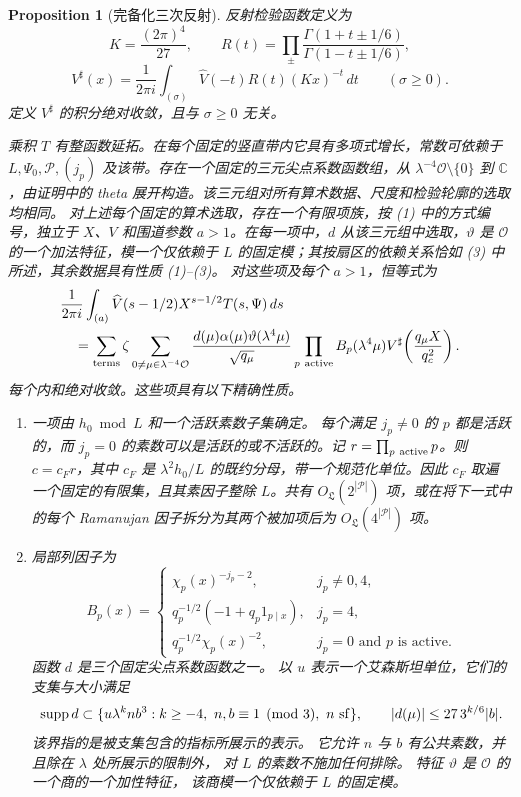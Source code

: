 \documentclass[11pt,a4paper]{article}
\numberwithin{equation}{section}
\numberwithin{figure}{section}
\newtheorem{proposition}[theorem]{Proposition}
\theoremstyle{definition}
\theoremstyle{remark}
\begin{document}
\begin{proposition}[完备化三次反射]
反射检验函数定义为
\[
 K=\frac{(2\pi)^4}{27},\qquad
 R(t)=\prod_{\pm}\frac{\Gamma(1+t\pm1/6)}{\Gamma(1-t\pm1/6)},
\]
\[
 V^\sharp(x)=\frac1{2\pi i}\int_{(\sigma)}
       \widehat V(-t)R(t)(Kx)^{-t}\,dt\qquad(\sigma\ge0).
\]
定义 $V^\sharp$ 的积分绝对收敛，且与 $\sigma\ge0$ 无关。

乘积 $T$ 有整函数延拓。在每个固定的竖直带内它具有多项式增长，常数可依赖于 $L,\Psi_0,\mathcal P,(j_p)$ 及该带。存在一个固定的三元尖点系数函数组，从 $\lambda^{-4}\mathcal O\setminus\{0\}$ 到 $\mathbb C$，由证明中的 theta 展开构造。该三元组对所有算术数据、尺度和检验轮廓的选取均相同。
对上述每个固定的算术选取，存在一个有限项族，按 (1) 中的方式编号，独立于 $X$、$V$ 和围道参数 $a>1$。在每一项中，$d$ 从该三元组中选取，$\vartheta$ 是 $\mathcal O$ 的一个加法特征，模一个仅依赖于 $L$ 的固定模；其按扇区的依赖关系恰如 (3) 中所述，其余数据具有性质 (1)--(3)。
对这些项及每个 $a>1$，恒等式为
\begin{equation}\label{eq:reflection}
 \begin{aligned}
 &\frac1{2\pi i}\int_{(a)}\widehat V(s-1/2)X^{s-1/2}T(s,\Psi)\,ds\\
 &\quad=\sum_{\text{terms}}\zeta
 \sum_{0\ne\mu\in\lambda^{-4}\mathcal O}
 \frac{d(\mu)\alpha(\mu)\vartheta(\lambda^4\mu)}{\sqrt{q_\mu}}
 \prod_{p\ {\rm active}}B_p(\lambda^4\mu)
 V^\sharp\!\left(\frac{q_\mu X}{q_c^2}\right).
 \end{aligned}
\end{equation}
每个内和绝对收敛。这些项具有以下精确性质。

\begin{enumerate}
\item 一项由 $h_0\bmod L$ 和一个活跃素数子集确定。
每个满足 $j_p\ne0$ 的 $p$ 都是活跃的，而 $j_p=0$ 的素数可以是活跃的或不活跃的。记 $r=\prod_{p\ {\rm active}}p$。则
$c=c_Fr$，其中 $c_F$ 是 $\lambda^2h_0/L$ 的既约分母，带一个规范化单位。因此 $c_F$ 取遍一个固定的有限集，且其素因子整除 $L$。共有
$O_{\mathfrak L}(2^{|\mathcal P|})$ 项，或在将下一式中的每个 Ramanujan 因子拆分为其两个被加项后为
$O_{\mathfrak L}(4^{|\mathcal P|})$ 项。\item 局部列因子为
\[
 B_p(x)=\begin{cases}
 \chi_p(x)^{-j_p-2},&j_p\ne0,4,\\
 q_p^{-1/2}(-1+q_p1_{p\mid x}),&j_p=4,\\
 q_p^{-1/2}\chi_p(x)^{-2},&j_p=0\text{ and }p\text{ is active}.
 \end{cases}
\]
函数 $d$ 是三个固定尖点系数函数之一。
以 $u$ 表示一个艾森斯坦单位，它们的支集与大小满足
\begin{equation}
 \operatorname{supp}d\subset
 \{u\lambda^k n b^3:k\ge-4,\ n,b\equiv1\pmod3,\ n\ {\rm sf}\},
 \qquad |d(\mu)|\le27\,3^{k/6}|b|.
 \label{old-eq:4.3}
\end{equation}
该界指的是被支集包含的指标所展示的表示。
它允许 $n$ 与 $b$ 有公共素数，并且除在 $\lambda$ 处所展示的限制外，
对 $L$ 的素数不施加任何排除。
特征 $\vartheta$ 是 $\mathcal O$ 的一个商的一个加性特征，
该商模一个仅依赖于 $L$ 的固定模。


\end{enumerate}
\end{proposition}
\end{document}
